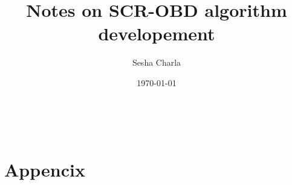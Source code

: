 \documentclass[letterpaper, 11pt]{article}
\title{Notes on SCR-OBD algorithm developement}
\author{Sesha Charla}
\date{\today}
\begin{document}
\maketitle
\tableofcontents
\newpage
\
\newpage

\newpage

\newpage

\newpage

\newpage

\newpage

\newpage

\newpage
\section{Appencix}


\newpage
\nocite{}


\end{document}

